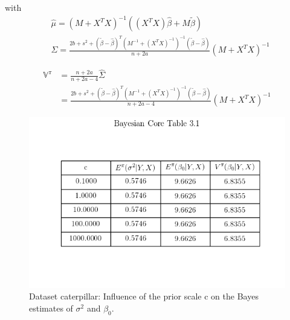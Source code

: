 \documentclass{article}
\begin{document}
with 
\begin{equation}
\begin{aligned}
    & \hat{\mu} = (M+X^{T}X)^{-1}((X^{T}X)\hat{\beta}+M\tilde{\beta}) \\
    & \hat{\Sigma} = \frac{2b+s^2 +(\tilde{\beta}-\hat{\beta})^{T} (M^{-1}+(X^{T}X)^{-1})^{-1} (\tilde{\beta}-\hat{\beta})}{n+2a}(M+X^{T}X)^{-1}
\end{aligned}
\end{equation}

\begin{equation}
\begin{aligned}
    \mathbb{V}^{\pi} &= \frac{n+2a}{n+2a-4} \hat{\Sigma} \\
    &=  \frac{2b+s^2 +(\tilde{\beta}-\hat{\beta})^{T} (M^{-1}+(X^{T}X)^{-1})^{-1} (\tilde{\beta}-\hat{\beta})}{n+2a-4}(M+X^{T}X)^{-1}
\end{aligned}
\end{equation}

\begin{figure}[h!]
\centering
\includegraphics[scale=0.6]{Table3_1.png}
\caption{Dataset caterpillar: Influence of the prior scale c on the Bayes estimates of $\sigma^2$ and $\beta_{0}$.}
\end{figure}
\end{document}
